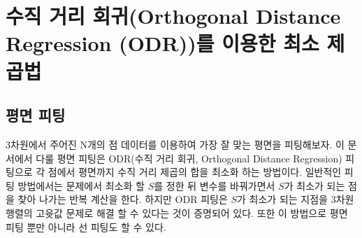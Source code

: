 \documentclass[chapter,a4paper,10pt]{oblivoir}
\begin{document}
\chapter{수직 거리 회귀(Orthogonal Distance Regression (ODR))를 이용한 최소 제곱법}
\section{평면 피팅}\label{section_fitplane}

3차원에서 주어진 N개의 점 데이터를 이용하여 가장 잘 맞는 평면을 피팅해보자.
이 문서에서 다룰 평면 피팅은 ODR(수직 거리 회귀, Orthogonal Distance Regression) 피팅으로
각 점에서 평면까지 수직 거리 제곱의 합을 최소화 하는 방법이다.
일반적인 피팅 방법에서는 문제에서 최소화 할 $S$를 정한 뒤 변수를 바꿔가면서
$S$가 최소가 되는 점을 찾아 나가는 반복 계산을 한다.
하지만 ODR 피팅은 $S$가 최소가 되는 지점을 3차원 행렬의 고윳값 문제로 해결 할 수 있다는 것이 증명되어 있다.
또한 이 방법으로 평면 피팅 뿐만 아니라 선 피팅도 할 수 있다.
\end{document}
